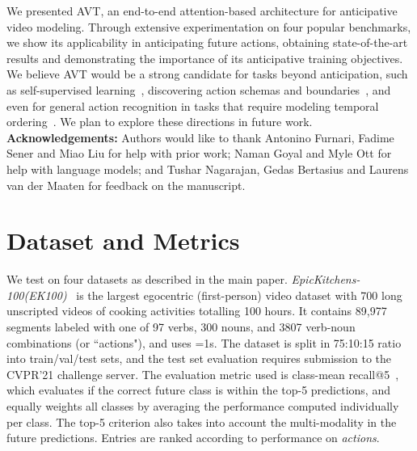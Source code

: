 \documentclass[10pt,twocolumn,letterpaper]{article}
\newcommand{\eknewfull}{EpicKitchens-100\xspace}
\newcommand{\eknew}{EK100\xspace}
\newcommand{\sota}{state-of-the-art\xspace}
\newcommand{\method}{AVT\xspace}
\newcommand{\lossBoth}{anticipative\xspace}
\begin{document}

We presented \method, an end-to-end attention-based architecture for \lossBoth video modeling. Through extensive experimentation on four popular benchmarks, we show its applicability in anticipating future actions, obtaining \sota results and demonstrating the importance of its \lossBoth training objectives. We believe \method would be a strong candidate for tasks beyond anticipation, such as self-supervised learning~\cite{han2020memdpc,vondrick2016anticipating}, discovering action schemas and boundaries~\cite{shou2021generic,piaget1935naissance}, and even for general action recognition in tasks that require modeling temporal ordering~\cite{goyal2017something}. We plan to explore these directions in future work.
% 
{\noindent \bf Acknowledgements:}
Authors would like to thank Antonino Furnari, Fadime Sener and Miao Liu for help with prior work; Naman Goyal and Myle Ott for help with language models; and Tushar Nagarajan, Gedas Bertasius and Laurens van der Maaten for feedback on the manuscript.
 
{\small


}
\clearpage

\appendix





\section{Dataset and Metrics}\label{sec:appdx:dataset}
We test on four datasets as described in the main paper.
{\em \eknewfull (\eknew)}~\cite{damen2020rescaling} is the largest egocentric (first-person) video dataset with 700 long unscripted videos of cooking activities totalling 100 hours.
It contains 89,977 segments labeled with one of 97 verbs, 300 nouns, and 3807 verb-noun combinations (or ``actions"), and uses =1s. The dataset is split in 75:10:15 ratio into train/val/test sets, and the test set evaluation requires submission to the CVPR'21 challenge server. 
The evaluation metric used is class-mean recall@5~\cite{furnari2018leveraging}, which evaluates if the correct future class is within the top-5 predictions, and equally weights all classes by averaging the performance computed individually per class. The top-5 criterion also takes into account the multi-modality in the future predictions.
Entries are ranked according to performance on \emph{actions}.   
\end{document}
